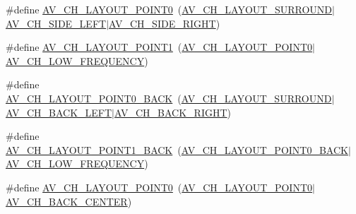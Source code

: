 \begin{DoxyCompactItemize}
\#define \hyperlink{group__channel__mask__c_ga10eddec555bcf849efce5158b0cbdb50}{A\+V\+\_\+\+C\+H\+\_\+\+L\+A\+Y\+O\+U\+T\+\_\+P\+O\+I\+N\+T0}~(\hyperlink{group__channel__mask__c_ga625aec7f2285dc35e3ed801e91889564}{A\+V\+\_\+\+C\+H\+\_\+\+L\+A\+Y\+O\+U\+T\+\_\+\+S\+U\+R\+R\+O\+U\+ND}$\vert$\hyperlink{group__channel__masks_ga02e55f35249dfa57a2e4edfd3acfec4f}{A\+V\+\_\+\+C\+H\+\_\+\+S\+I\+D\+E\+\_\+\+L\+E\+FT}$\vert$\hyperlink{group__channel__masks_ga947b60ab70c428ebb07c8b9c87023b39}{A\+V\+\_\+\+C\+H\+\_\+\+S\+I\+D\+E\+\_\+\+R\+I\+G\+HT})
\item 
\#define \hyperlink{group__channel__mask__c_gac36a042dc21866f9043ce930f300d0df}{A\+V\+\_\+\+C\+H\+\_\+\+L\+A\+Y\+O\+U\+T\+\_\+P\+O\+I\+N\+T1}~(\hyperlink{group__channel__mask__c_ga10eddec555bcf849efce5158b0cbdb50}{A\+V\+\_\+\+C\+H\+\_\+\+L\+A\+Y\+O\+U\+T\+\_\+P\+O\+I\+N\+T0}$\vert$\hyperlink{group__channel__masks_gab19b66e345cf1f9d50ffc26c28862bcc}{A\+V\+\_\+\+C\+H\+\_\+\+L\+O\+W\+\_\+\+F\+R\+E\+Q\+U\+E\+N\+CY})
\item 
\#define \hyperlink{group__channel__mask__c_gab057e9fd36b7e929d000d663badbafc6}{A\+V\+\_\+\+C\+H\+\_\+\+L\+A\+Y\+O\+U\+T\+\_\+P\+O\+I\+N\+T0\+\_\+\+B\+A\+CK}~(\hyperlink{group__channel__mask__c_ga625aec7f2285dc35e3ed801e91889564}{A\+V\+\_\+\+C\+H\+\_\+\+L\+A\+Y\+O\+U\+T\+\_\+\+S\+U\+R\+R\+O\+U\+ND}$\vert$\hyperlink{group__channel__masks_gaa3cae8c6d0eaab3dc3ce178f6af81ae2}{A\+V\+\_\+\+C\+H\+\_\+\+B\+A\+C\+K\+\_\+\+L\+E\+FT}$\vert$\hyperlink{group__channel__masks_ga7a7ab3bb418bf9672dcdf6554346e5eb}{A\+V\+\_\+\+C\+H\+\_\+\+B\+A\+C\+K\+\_\+\+R\+I\+G\+HT})
\item 
\#define \hyperlink{group__channel__mask__c_gae9da5d6069701241a22f3af19b152662}{A\+V\+\_\+\+C\+H\+\_\+\+L\+A\+Y\+O\+U\+T\+\_\+P\+O\+I\+N\+T1\+\_\+\+B\+A\+CK}~(\hyperlink{group__channel__mask__c_gab057e9fd36b7e929d000d663badbafc6}{A\+V\+\_\+\+C\+H\+\_\+\+L\+A\+Y\+O\+U\+T\+\_\+P\+O\+I\+N\+T0\+\_\+\+B\+A\+CK}$\vert$\hyperlink{group__channel__masks_gab19b66e345cf1f9d50ffc26c28862bcc}{A\+V\+\_\+\+C\+H\+\_\+\+L\+O\+W\+\_\+\+F\+R\+E\+Q\+U\+E\+N\+CY})
\item 
\#define \hyperlink{group__channel__mask__c_ga0fbea70d397140a524b55018128fca77}{A\+V\+\_\+\+C\+H\+\_\+\+L\+A\+Y\+O\+U\+T\+\_\+P\+O\+I\+N\+T0}~(\hyperlink{group__channel__mask__c_ga10eddec555bcf849efce5158b0cbdb50}{A\+V\+\_\+\+C\+H\+\_\+\+L\+A\+Y\+O\+U\+T\+\_\+P\+O\+I\+N\+T0}$\vert$\hyperlink{group__channel__masks_ga68650a364e52edb62d5984dddec4f935}{A\+V\+\_\+\+C\+H\+\_\+\+B\+A\+C\+K\+\_\+\+C\+E\+N\+T\+ER})
\item 

\end{DoxyCompactItemize}
